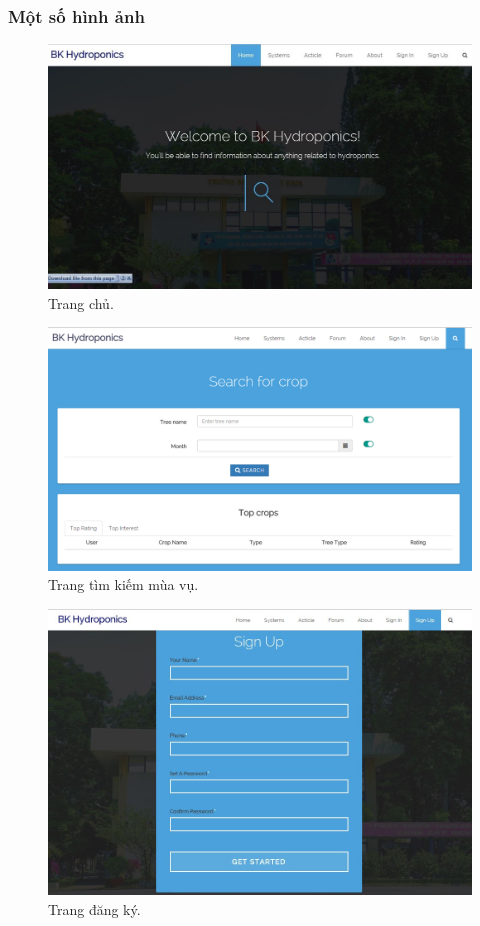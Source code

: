 \documentclass[a4paper,12pt,oneside]{article}
\begin{document}
\subsubsection{Một số hình ảnh}
\begin{center}

\begin{figure}[H]
\centering
\includegraphics[scale=.5]{hinh/web_home.jpg}
\caption{Trang chủ.}
\end{figure}

\begin{figure}[H]
\centering
\includegraphics[scale=.5]{hinh/search_page.png}
\caption{Trang tìm kiếm mùa vụ.}
\end{figure}

\begin{figure}[H]
\centering
\includegraphics[scale=.6]{hinh/web_register.jpg}
\caption{Trang đăng ký.}
\end{figure}


\end{center}
\end{document}
